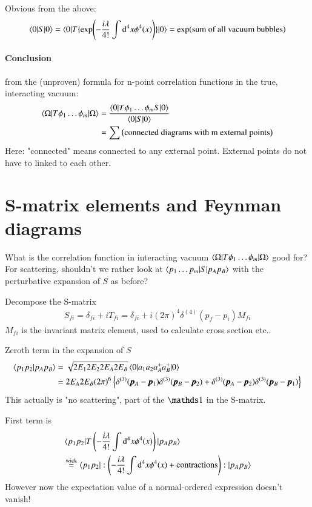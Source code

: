 Obvious from the above:
\begin{align*}
	\braket{0 | S | 0} = \braket{0 | T \{\exp(-\frac{i\lambda}{4!}\int \dd^4 x \phi^4(x))\}|0} = \exp(\text{sum of all vacuum bubbles})
\end{align*}

\paragraph{Conclusion} from the (unproven) formula for n-point correlation functions in the true, interacting vacuum:
\begin{align}
	\braket{\Omega | T \phi_1 \dots \phi_m | \Omega} &= \frac{ \braket{0 | T \phi_1 \dots \phi_m S |0}  }{ \braket{0 | S | 0}} \\
													 &= \sum \left( \text{connected diagrams with m external points} \right)
\end{align}
Here: "connected" means connected to any external point. External points do not have to linked to each other.

\section{S-matrix elements and Feynman diagrams}
What is the correlation function in interacting vacuum $\braket{\Omega| T {\phi_1\dots\phi_m} | \Omega}$ good for? For scattering, shouldn't we rather look at $\braket{p_1 \dots p_m | S | p_A p_B}$
with the perturbative expansion of $S$ as before?

Decompose the S-matrix
\begin{align}
	S_{fi} = \delta_{fi} + i T_{fi} = \delta_{fi} + i(2\pi)^4 \delta^{(4)} (p_f-p_i)M_{fi}
\end{align}
$M_{fi}$ is the invariant matrix element, used to calculate cross section etc..

Zeroth term in the expansion of $S$
\begin{align*}
	\braket{ p_1 p_2 | p_A p_B} &= \sqrt{2E_1 2E_2 2E_A 2E_B} \braket{0 | a_1 a_2 a^+_A a^+_B | 0} \\
								&= 2E_A 2E_B (2\pi)^6 \left\{ \delta^{(3)}(\pmb{p}_A-\pmb{p}_1) \delta^{(3)}(\pmb{p}_B - \pmb{p}_2) +   \delta^{(3)}(\pmb{p}_A-\pmb{p}_2) \delta^{(3)}(\pmb{p}_B - \pmb{p}_1)\right\}
\end{align*}
This actually is "no scattering", part of the $\id$ in the S-matrix.

First term is 
\begin{align*}
	&\braket{p_1 p_2 | T \left( -\frac{i\lambda}{4!} \int \dd^4 x \phi^4(x) \right)|p_A p_B } \\
	&\stackrel{\text{wick}}{=} \braket{p_1 p_2 | :\left( -\frac{i\lambda}{4!} \int \dd^4 x \phi^4(x) + \text{contractions}\right ):|p_A p_B }
\end{align*}
However now the expectation value of a normal-ordered expression doesn't vanish!

